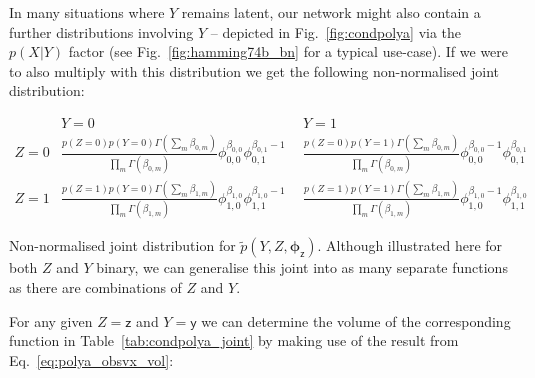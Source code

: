 \documentclass[oneside,english]{scrbook}
\begin{document}
In many situations where $Y$ remains latent, our network might also
contain a further distributions involving $Y$ -- depicted in
Fig.~\ref{fig:condpolya} via the $p(X|Y)$ factor (see
Fig.~\ref{fig:hamming74b_bn} for a typical use-case). If we were to
also multiply with this distribution we get the following
non-normalised joint distribution:

\begin{table}[!h]
  \begin{center}
    \(
    \renewcommand{\arraystretch}{1.5}
    \begin{array}{l|cc}
      & Y=0 & Y=1 \\ \hline
      Z=0 & \frac{p(Z=0)p(Y=0)\Gamma(\sum_m\beta_{0,m}) }{\prod_{m}\Gamma(\beta_{0,m})} \phi_{0,0}^{\beta_{0,0}}  \phi_{0,1}^{\beta_{0,1}-1}  ~~
      & \frac{p(Z=0)p(Y=1)\Gamma(\sum_m\beta_{0,m}) }{\prod_{m}\Gamma(\beta_{0,m})} \phi_{0,0}^{\beta_{0,0}-1} \phi_{0,1}^{\beta_{0,1}}\\[3mm]
      Z=1 & \frac{p(Z=1)p(Y=0)\Gamma(\sum_m\beta_{1,m}) }{\prod_{m}\Gamma(\beta_{1,m})} \phi_{1,0}^{\beta_{1,0}} \phi_{1,1}^{\beta_{1,0}-1}
      & \frac{p(Z=1)p(Y=1)\Gamma(\sum_m\beta_{1,m}) }{\prod_{m}\Gamma(\beta_{1,m})} \phi_{1,0}^{\beta_{1,0}-1} \phi_{1,1}^{\beta_{1,0}}
    \end{array} \)
  \end{center}
  \caption{Non-normalised joint distribution for
    $\tilde{p}(Y,Z,\bm{\phi}_{\mathsf{z}})$. Although illustrated here for both $Z$
    and $Y$ binary, we can generalise this joint into as many separate
    functions as there are combinations of $Z$ and
    $Y$.\label{tab:condpolya_joint} }
\end{table}

For any given $Z=\mathsf{z}$ and $Y=\mathsf{y}$ we can determine the
volume of the corresponding function in Table~\ref{tab:condpolya_joint}
by making use of the result from Eq.~\ref{eq:polya_obsvx_vol}:
\end{document}
